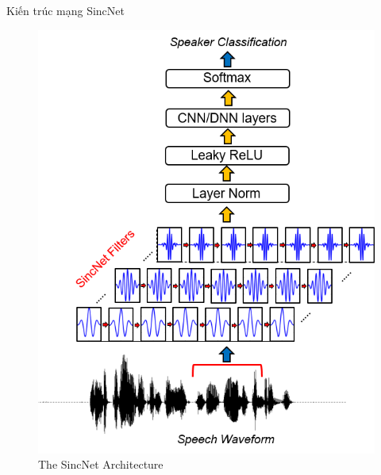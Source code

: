 \documentclass[11pt]{beamer}
\begin{document}
\begin{frame}{Kiến trúc mạng SincNet}
	\begin{figure}[H]
		\includegraphics[width=0.4\linewidth]{images/SincNet.png}
		\caption{The SincNet Architecture}
		\label{fig:writing-thesis}
	\end{figure}
\end{frame}
\end{document}
